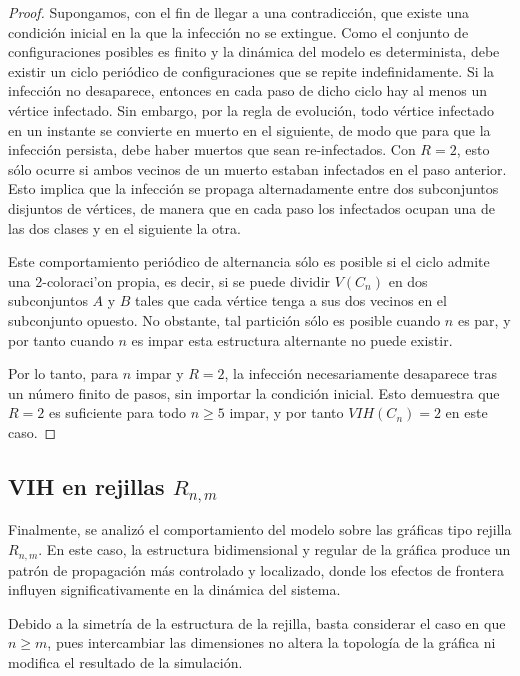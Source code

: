 \documentclass[12pt,titlepage,twoside,openright]{book}
\begin{document}
\begin{proof}
    Supongamos, con el fin de llegar a una contradicci\'on, que existe una condici\'on inicial en la que la infecci\'on no se extingue. Como el conjunto de configuraciones posibles es finito y la din\'amica del modelo es determinista, debe existir un ciclo peri\'odico de configuraciones que se repite indefinidamente. Si la infecci\'on no desaparece, entonces en cada paso de dicho ciclo hay al menos un v\'ertice infectado. Sin embargo, por la regla de evoluci\'on, todo v\'ertice infectado en un instante se convierte en muerto en el siguiente, de modo que para que la infecci\'on persista, debe haber muertos que sean re-infectados. Con $R=2$, esto s\'olo ocurre si ambos vecinos de un muerto estaban infectados en el paso anterior. Esto implica que la infecci\'on se propaga alternadamente entre dos subconjuntos disjuntos de v\'ertices, de manera que en cada paso los infectados ocupan una de las dos clases y en el siguiente la otra. 
    
    Este comportamiento peri\'odico de alternancia s\'olo es posible si el ciclo admite una 2-coloraci'on propia, es decir, si se puede dividir $V(C_n)$ en dos subconjuntos $A$ y $B$ tales que cada v\'ertice tenga a sus dos vecinos en el subconjunto opuesto. No obstante, tal partici\'on s\'olo es posible cuando $n$ es par, y por tanto cuando $n$ es impar esta estructura alternante no puede existir.

    Por lo tanto, para $n$ impar y $R=2$, la infecci\'on necesariamente desaparece tras un n\'umero finito de pasos, sin importar la condici\'on inicial. Esto demuestra que $R=2$ es suficiente para todo $n\geq5$ impar, y por tanto $VIH(C_n)=2$ en este caso.
\end{proof}

\subsection{VIH en rejillas $R_{n,m}$}
Finalmente, se analiz\'o el comportamiento del modelo sobre las gr\'aficas tipo rejilla $R_{n,m}$. En este caso, la estructura bidimensional y regular de la gr\'afica produce un patr\'on de propagaci\'on m\'as controlado y localizado, donde los efectos de frontera influyen significativamente en la din\'amica del sistema.

Debido a la simetr\'ia de la estructura de la rejilla, basta considerar el caso en que $n \geq m$, pues intercambiar las dimensiones no altera la topolog\'ia de la gr\'afica ni modifica el resultado de la simulaci\'on.
\end{document}
